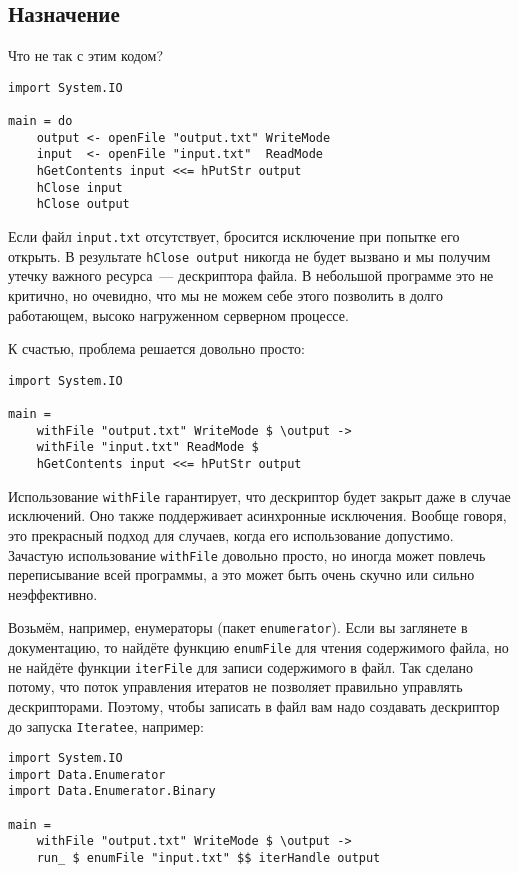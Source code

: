 \subsection{Назначение}
Что не так с этим кодом?
\begin{lstlisting}
import System.IO

main = do
    output <- openFile "output.txt" WriteMode
    input  <- openFile "input.txt"  ReadMode
    hGetContents input <<= hPutStr output
    hClose input
    hClose output
\end{lstlisting}
Если файл \verb*|input.txt| отсутствует, бросится исключение при попытке его открыть. В
результате \lstinline'hClose output' никогда не будет вызвано и мы получим утечку важного ресурса~--- дескриптора файла. В небольшой программе это не критично, но очевидно, что мы не
можем себе этого позволить в долго работающем, высоко нагруженном серверном процессе.

К счастью, проблема решается довольно просто:
\begin{lstlisting}
import System.IO

main =
    withFile "output.txt" WriteMode $ \output ->
    withFile "input.txt" ReadMode $ 
    hGetContents input <<= hPutStr output
\end{lstlisting}

Использование \lstinline'withFile' гарантирует, что дескриптор будет закрыт даже в
случае
исключений. Оно также поддерживает асинхронные исключения. Вообще говоря, это прекрасный
подход для случаев, когда его использование допустимо. Зачастую использование \lstinline'withFile' довольно просто, но иногда может повлечь переписывание всей программы, а это может быть очень скучно или сильно неэффективно.

Возьмём, например, енумераторы (пакет \texttt{enumerator}). Если вы заглянете в документацию, то найдёте функцию
\lstinline'enumFile' для чтения содержимого файла, но не найдёте функции
\lstinline'iterFile' для записи
содержимого в файл. Так сделано потому, что поток управления итератов не позволяет
правильно управлять дескрипторами. Поэтому, чтобы записать в файл вам надо создавать
дескриптор до запуска \lstinline{Iteratee}, например: 

\begin{lstlisting}
import System.IO
import Data.Enumerator
import Data.Enumerator.Binary

main =
    withFile "output.txt" WriteMode $ \output ->
    run_ $ enumFile "input.txt" $$ iterHandle output
\end{lstlisting}

